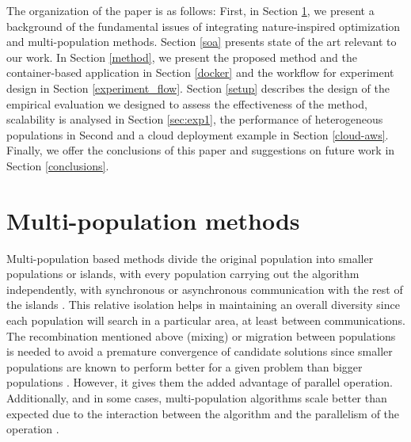 \documentclass[review]{elsarticle}
\begin{document}
The organization of the paper is as follows: First, in Section \ref{multi}, we present a
background of the fundamental issues of integrating nature-inspired optimization
and multi-population methods. Section \ref{soa} presents state of the art relevant to
our work. In Section \ref{method}, we present the proposed method and the container-based
application in Section \ref{docker} and the workflow for experiment design in Section \ref{experiment_flow}. %
Section \ref{setup} describes
the design of the empirical evaluation we designed to assess the effectiveness
of the method, scalability is analysed in Section \ref{sec:exp1}, %
the performance of heterogeneous populations in Second \label{sec:exp2} 
and a cloud deployment example in Section \ref{cloud-aws}. %
Finally, we
offer the conclusions of this paper and suggestions on future work in Section \ref{conclusions}.


\section{Multi-population methods} %
\label{multi}

Multi-population based methods divide the original population into
smaller populations or islands, with every population carrying out the
algorithm independently, with synchronous or asynchronous communication with the
rest of the islands \cite{Ma2019}.%
This relative isolation helps in maintaining an overall
diversity since each population will search in a particular area, at least
between communications. The recombination mentioned above (mixing) or migration
between populations is needed to avoid a premature convergence of candidate
solutions since smaller populations are known to perform better for a given
problem than bigger populations \cite{li2016multi,wu2016differential}. %
However, it gives them the added advantage of
parallel operation. Additionally, and in some cases, multi-population algorithms
scale better than expected due to the interaction between the algorithm and the
parallelism of the operation \cite{ALBA20027}. %
\end{document}
